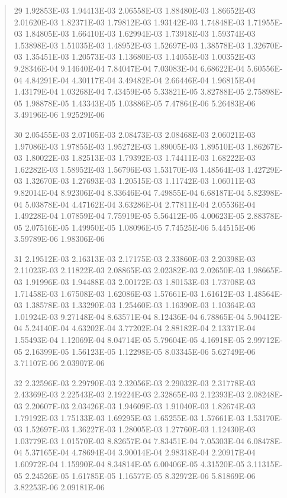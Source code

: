 \documentclass[letterpaper,10pt,english]{sphinxmanual}
\begin{document}
\begin{quote}
\begin{DUlineblock}{0em}
\item[] 29   1.92853E-03  1.94413E-03  2.06558E-03  1.88480E-03  1.86652E-03  2.01620E-03  1.82371E-03  1.79812E-03  1.93142E-03  1.74848E-03  1.71955E-03  1.84805E-03  1.66410E-03  1.62994E-03  1.73918E-03  1.59374E-03  1.53898E-03  1.51035E-03  1.48952E-03  1.52697E-03  1.38578E-03  1.32670E-03  1.35451E-03  1.20573E-03  1.13680E-03  1.14055E-03  1.00352E-03  9.28346E-04  9.14640E-04  7.84047E-04  7.03083E-04  6.68622E-04  5.60556E-04  4.84291E-04  4.30117E-04  3.49482E-04  2.66446E-04  1.96815E-04  1.43179E-04  1.03268E-04  7.43459E-05  5.33821E-05  3.82788E-05  2.75898E-05  1.98878E-05  1.43343E-05  1.03886E-05  7.47864E-06  5.26483E-06  3.49196E-06  1.92529E-06
\item[] 30   2.05455E-03  2.07105E-03  2.08473E-03  2.08468E-03  2.06021E-03  1.97086E-03  1.97855E-03  1.95272E-03  1.89005E-03  1.89510E-03  1.86267E-03  1.80022E-03  1.82513E-03  1.79392E-03  1.74411E-03  1.68222E-03  1.62282E-03  1.58952E-03  1.56796E-03  1.53170E-03  1.48564E-03  1.42729E-03  1.32670E-03  1.27693E-03  1.20515E-03  1.11742E-03  1.06011E-03  9.82014E-04  8.92306E-04  8.33646E-04  7.49855E-04  6.68187E-04  5.82398E-04  5.03878E-04  4.47162E-04  3.63286E-04  2.77811E-04  2.05536E-04  1.49228E-04  1.07859E-04  7.75919E-05  5.56412E-05  4.00623E-05  2.88378E-05  2.07516E-05  1.49950E-05  1.08096E-05  7.74525E-06  5.44515E-06  3.59789E-06  1.98306E-06
\item[] 31   2.19512E-03  2.16313E-03  2.17175E-03  2.33860E-03  2.20398E-03  2.11023E-03  2.11822E-03  2.08865E-03  2.02382E-03  2.02650E-03  1.98665E-03  1.91996E-03  1.94488E-03  2.00172E-03  1.80153E-03  1.73708E-03  1.71458E-03  1.67508E-03  1.62086E-03  1.57661E-03  1.61612E-03  1.48564E-03  1.38578E-03  1.33290E-03  1.25460E-03  1.16390E-03  1.10364E-03  1.01924E-03  9.27148E-04  8.63571E-04  8.12436E-04  6.78865E-04  5.90412E-04  5.24140E-04  4.63202E-04  3.77202E-04  2.88182E-04  2.13371E-04  1.55493E-04  1.12069E-04  8.04714E-05  5.79604E-05  4.16918E-05  2.99712E-05  2.16399E-05  1.56123E-05  1.12298E-05  8.03345E-06  5.62749E-06  3.71107E-06  2.03907E-06
\item[] 32   2.32596E-03  2.29790E-03  2.32056E-03  2.29032E-03  2.31778E-03  2.43369E-03  2.22543E-03  2.19224E-03  2.32865E-03  2.12393E-03  2.08248E-03  2.20607E-03  2.03426E-03  1.94609E-03  1.91040E-03  1.82674E-03  1.79192E-03  1.75133E-03  1.69295E-03  1.65255E-03  1.57661E-03  1.53170E-03  1.52697E-03  1.36227E-03  1.28005E-03  1.27760E-03  1.12430E-03  1.03779E-03  1.01570E-03  8.82657E-04  7.83451E-04  7.05303E-04  6.08478E-04  5.37165E-04  4.78694E-04  3.90014E-04  2.98318E-04  2.20917E-04  1.60972E-04  1.15990E-04  8.34814E-05  6.00406E-05  4.31520E-05  3.11315E-05  2.24526E-05  1.61785E-05  1.16577E-05  8.32972E-06  5.81869E-06  3.82253E-06  2.09181E-06

\end{DUlineblock}
\end{quote}
\end{document}
